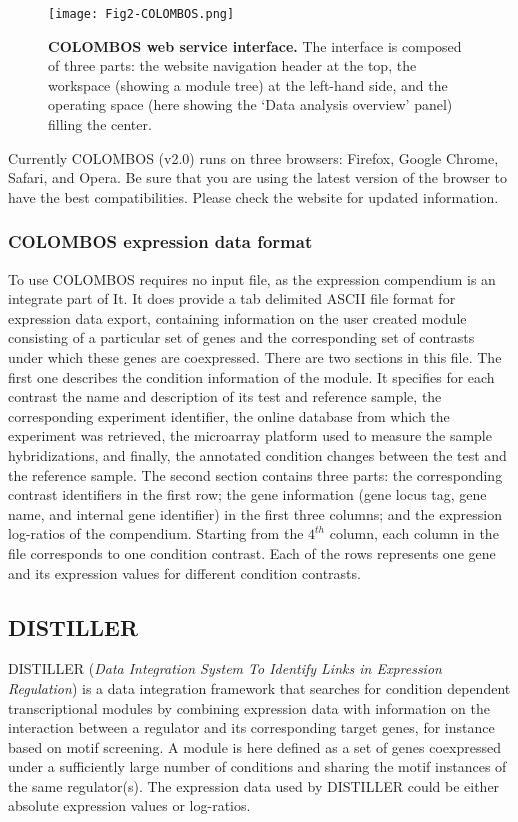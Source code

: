 \begin{figure}[tb]
	\centering
  	\texttt{[image: Fig2-COLOMBOS.png]}
	\caption[COLOMBOS web service interface]{\textbf{COLOMBOS web 
	service interface.} 
	The interface is composed of three parts: the website navigation header at 
	the top, the workspace (showing a module tree) at the left-hand side, and 
	the operating space (here showing the `Data analysis overview' panel) 
	filling the center.}
	\label{fig:colombos}
\end{figure}

Currently COLOMBOS (v2.0) runs on three browsers: Firefox, Google Chrome,
Safari, and Opera. Be sure that you are using the latest version of the browser
to have the best compatibilities. Please check the website for updated
information.

\subsubsection{COLOMBOS expression data format}\label{sec:dist-format-col}
To use COLOMBOS requires no input file, as the expression compendium is an
integrate part of It.  
%
It does provide a tab delimited ASCII file format for expression data export,
containing information on the user created module consisting of a particular set
of genes and the corresponding set of contrasts under which these genes are
coexpressed.
%
There are two sections in this file. The first one describes the condition
information of the module. It specifies for each contrast the name and
description of its test and reference sample, the corresponding experiment
identifier, the online database from which the experiment was retrieved, the
microarray platform used to measure the sample hybridizations, and finally, the
annotated condition changes between the test and the reference sample.
%
The second section contains three parts: the corresponding contrast identifiers
in the first row; the gene information (gene locus tag, gene name, and internal
gene identifier) in the first three columns; and the expression log-ratios of
the compendium.
%
Starting from the $4^{th}$ column, each column in the file corresponds to one
condition contrast. Each of the rows represents one gene and its expression
values for different condition contrasts.


\subsection{DISTILLER}\label{sec:dist-distiller}
DISTILLER (\textit{Data Integration System To Identify Links in Expression
  Regulation}) is a data integration framework that searches for condition
dependent transcriptional modules by combining expression data with information
on the interaction between a regulator and its corresponding target genes, for
instance based on motif screening. A module is here defined as a set of genes
coexpressed under a sufficiently large number of conditions and sharing the
motif instances of the same regulator(s).  The expression data used by DISTILLER
could be either absolute expression values or log-ratios.

